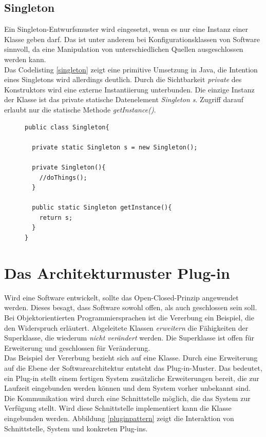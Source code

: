 \FloatBarrier
\subsection{Singleton}

Ein Singleton-Entwurfsmuster wird eingesetzt, wenn es nur eine Instanz einer Klasse geben darf\cite[3.4]{starke:swa}. Das ist unter anderem bei Konfigurationsklassen von Software sinnvoll, da eine Manipulation von unterschiedlichen Quellen ausgeschlossen werden kann.\\
Das Codelisting \ref{singleton} zeigt eine primitive Umsetzung in Java, die Intention eines Singletons wird allerdings deutlich. Durch die Sichtbarkeit \textit{private} des Konstruktors wird eine externe Instantiierung unterbunden. Die einzige Instanz der Klasse ist das private statische Datenelement \textit{Singleton s}. Zugriff darauf erlaubt nur die statische Methode \textit{getInstance()}.

\begin{figure}[htbp]
\begin{lstlisting}[frame=leftline]
public class Singleton{
		
  private static Singleton s = new Singleton();
		  
  private Singleton(){
    //doThings();
  }
		  
  public static Singleton getInstance(){
    return s;
  }
}
\end{lstlisting}

\end{figure}

\FloatBarrier
\section{Das Architekturmuster Plug-in}

Wird eine Software entwickelt, sollte das Open-Closed-Prinzip angewendet werden. Dieses besagt, dass Software sowohl offen, als auch geschlossen sein soll\cite[1.8]{goll:swa}. Bei Objekt\-orientierten Programmiersprachen ist die Vererbung ein Beispiel, die den Widerspruch erläutert. Abgeleitete Klassen \textit{erweitern} die Fähigkeiten der Superklasse, die wiederum \textit{nicht verändert} werden. Die Superklasse ist offen für Erweiterung und geschlossen für Veränderung.\\
Das Beispiel der Vererbung bezieht sich auf eine Klasse. Durch eine Erweiterung auf die Ebene der Softwarearchitektur entsteht das Plug-in-Muster. Das bedeutet, ein Plug-in stellt einem fertigen System zusätzliche Erweiterungen bereit, die zur Laufzeit eingebunden werden können und dem System vorher unbekannt sind. Die Kommunikation wird durch eine Schnittstelle möglich, die das System zur Verfügung stellt. Wird diese Schnittstelle implementiert kann die Klasse eingebunden werden. Abbildung \ref{pluginpattern} zeigt die Interaktion von Schnittstelle, System und konkreten Plug-ins.

